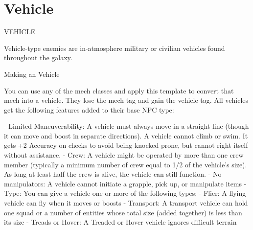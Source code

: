 \section{Vehicle}
                                                VEHICLE

Vehicle-type enemies are in-atmosphere military or civilian vehicles found throughout the galaxy.


Making an Vehicle

You can use any of the mech classes and apply this template to convert that mech into a vehicle.
They lose the mech tag and gain the vehicle tag. All vehicles get the following features added to
their base NPC type:

    -    Limited Maneuverability: A vehicle must always move in a straight line (though it can
         move and boost in separate directions). A vehicle cannot climb or swim. It gets +2
        Accuracy on checks to avoid being knocked prone, but cannot right itself without
        assistance.
    -   Crew: A vehicle might be operated by more than one crew member (typically a minimum
         number of crew equal to 1/2 of the vehicle’s size). As long at least half the crew is alive, the
        vehicle can still function.
    -    No manipulators: A vehicle cannot initiate a grapple, pick up, or manipulate items
    -   Type: You can give a vehicle one or more of the following types:
             -   Flier: A flying vehicle can fly when it moves or boosts
             -   Transport: A transport vehicle can hold one squad or a number of entities whose
                 total size (added together) is less than its size
             -   Treads or Hover: A Treaded or Hover vehicle ignores difficult terrain